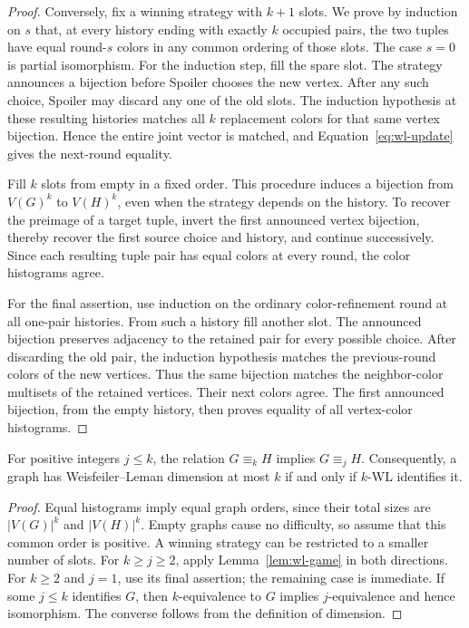 \begin{proof}
Conversely, fix a winning strategy with $k+1$ slots. We prove by
induction on $s$ that, at every history ending with exactly $k$
occupied pairs, the two tuples have equal round-$s$ colors in any
common ordering of those slots. The case $s=0$ is partial
isomorphism. For the induction step, fill the spare slot. The
strategy announces a bijection before Spoiler chooses the new
vertex. After any such choice, Spoiler may discard any one of the
old slots. The induction hypothesis at these resulting histories
matches all $k$ replacement colors for that same vertex bijection.
Hence the entire joint vector is matched, and
Equation~\eqref{eq:wl-update} gives the next-round equality.

Fill $k$ slots from empty in a fixed order. This procedure induces a
bijection from $V(G)^k$ to $V(H)^k$, even when the strategy depends
on the history. To recover the preimage of a target tuple, invert
the first announced vertex bijection, thereby recover the first
source choice and history, and continue successively. Since each
resulting tuple pair has equal colors at every round, the color
histograms agree.

For the final assertion, use induction on the ordinary
color-refinement round at all one-pair histories. From such a
history fill another slot. The announced bijection preserves
adjacency to the retained pair for every possible choice. After
discarding the old pair, the induction hypothesis matches the
previous-round colors of the new vertices. Thus the same bijection
matches the neighbor-color multisets of the retained vertices.
Their next colors agree. The first announced bijection, from the
empty history, then proves equality of all vertex-color histograms.
\end{proof}

\begin{lemma}
\label{lem:monotonicity}
For positive integers $j\le k$, the relation $G\equiv_k H$ implies
$G\equiv_j H$. Consequently, a graph has Weisfeiler--Leman dimension
at most $k$ if and only if $k$-WL identifies it.
\end{lemma}

\begin{proof}
Equal histograms imply equal graph orders, since their total sizes
are $|V(G)|^k$ and $|V(H)|^k$. Empty graphs cause no difficulty, so
assume that this common order is positive. A winning strategy can
be restricted to a smaller number of slots. For $k\ge j\ge 2$,
apply Lemma~\ref{lem:wl-game} in both directions. For $k\ge 2$ and
$j=1$, use its final assertion; the remaining case is immediate.
If some $j\le k$ identifies $G$, then $k$-equivalence to $G$
implies $j$-equivalence and hence isomorphism. The converse follows
from the definition of dimension.
\end{proof}


